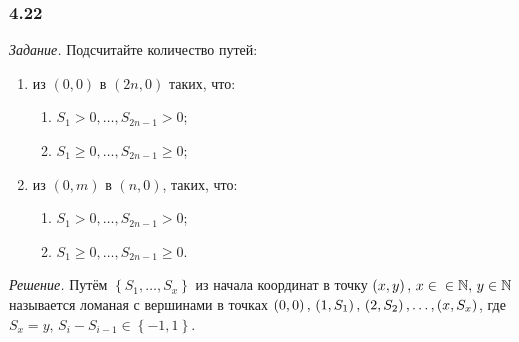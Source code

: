 \subsubsection*{4.22}

\textit{Задание.} Подсчитайте количество путей:
\begin{enumerate}[label=\alph*)]
\item из $ \left( 0, 0 \right) $ в $ \left( 2n, 0 \right) $ таких, что:
\begin{enumerate}[label=(\roman*)]
\item $S_1 > 0, \dotsc, S_{2n-1} > 0$;
\item $S_1 \geq 0, \dotsc, S_{2n-1} \geq 0$;
\end{enumerate}

\item из $ \left( 0, m \right) $ в $ \left( n, 0 \right) $, таких, что:
\begin{enumerate}[label=(\roman*)]
\item $S_1 > 0, \dotsc, S_{2n-1} > 0$;
\item $S_1 \geq 0, \dotsc, S_{2n-1} \geq 0$.
\end{enumerate}
\end{enumerate}

\textit{Решение.} Путём $ \left\{ S_1, \dotsc, S_x \right\} $ из начала координат в точку
$ \left( x, y \right), \, x \in \\ \in \mathbb{N}, \, y \in \mathbb{N} $
называется ломаная с вершинами в точках
$ \left( 0, 0 \right), \, \left( 1, S_1 \right), \\ \left( 2, S_2 \right), \dotsc, \left( x, S_x \right) $, где $S_x = y, \, S_i - S_{i-1} \in \left\{ -1, 1 \right\} .$

